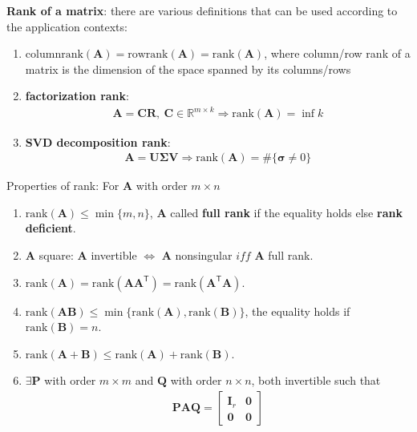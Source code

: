 \textbf{Rank of a matrix}: there are various definitions that can be used according to the application contexts:
\begin{enumerate}[{(1)}]
    \item \uline{$\mathrm{columnrank}(\mathbf{A})=\mathrm{rowrank}(\mathbf{A})=\mathrm{rank}(\mathbf{A})$},
    where column/row rank of a matrix is the dimension of the space spanned by its columns/rows
    
    \item \textbf{factorization rank}:
    \begin{gather}
        \mathbf{A}=\mathbf{CR},~\mathbf{C}\in\mathbb{R}^{m\times{k}}\Rightarrow
        \mathrm{rank}(\mathbf{A})=\inf{k}
    \end{gather}
    
    \item \textbf{SVD decomposition rank}:
    \begin{gather}
        \mathbf{A}=\mathbf{U\Sigma V}\Rightarrow
        \mathrm{rank}(\mathbf{A})=\#\{\bm{\sigma}\neq 0\}
    \end{gather}
\end{enumerate}

Properties of rank: For $\mathbf{A}$ with order $m\times n$
\begin{enumerate}[{(1)}]
    \item $\mathrm{rank}(\mathbf{A})\leq\min\{m,n\}$, 
    $\mathbf{A}$ called \textbf{full rank} if the equality holds else \textbf{rank deficient}.
    \item $\mathbf{A}$ square: $\mathbf{A}$ invertible $\iff$ $\mathbf{A}$ nonsingular $iff$ $\mathbf{A}$ full rank.
    \item $\mathrm{rank}(\mathbf{A})=\mathrm{rank}(\mathbf{AA}^\mathsf{T})=\mathrm{rank}(\mathbf{A}^\mathsf{T}\mathbf{A})$.
    \item $\mathrm{rank}(\mathbf{AB})\leq\min\{\mathrm{rank}(\mathbf{A}),\mathrm{rank}(\mathbf{B})\}$, the equality holds if $\mathrm{rank}(\mathbf{B})=n$.
    \item $\mathrm{rank}(\mathbf{A}+\mathbf{B})\leq\mathrm{rank}(\mathbf{A})+\mathrm{rank}(\mathbf{B})$.
    \item $\exists \mathbf{P}$ with order $m\times{m}$ and $\mathbf{Q}$ with order $n\times n$, both invertible such that 
    \begin{gather}
        \mathbf{PAQ}=\left[\begin{array}{cc}
            \mathbf{I}_r & \mathbf{0} \\
            \mathbf{0} & \mathbf{0}
        \end{array}\right]
    \end{gather}
\end{enumerate}

